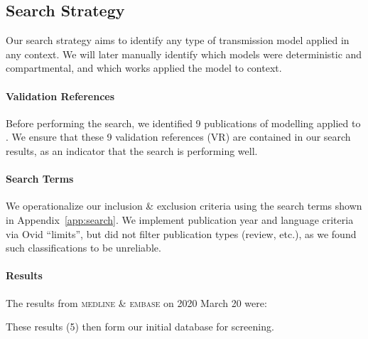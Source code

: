 \documentclass{article}
\begin{document}
\subsection{Search Strategy}
Our search strategy aims to identify
any type of \hiv transmission model applied in any context.
We will later manually identify
which models were deterministic and compartmental,
and which works applied the model to \ssa context.
\paragraph{Validation References}\n
Before performing the search, we identified
9 publications of \hiv modelling applied to \ssa.
We ensure that these 9 validation references (VR)
are contained in our search results,
as an indicator that the search is performing well.
\par
{}
\paragraph{Search Terms}\n
We operationalize our inclusion \& exclusion criteria
using the search terms shown in Appendix~\ref{app:search}.
We implement publication year and language criteria via Ovid ``limits'',
but did not filter publication types (review, etc.),
as we found such classifications to be unreliable.
\paragraph{Results}\n
The results from \textsc{medline} \& \textsc{embase} on 2020 March 20 were:
\begin{table}[h]
  \centerline{}
\end{table}
\par
These results (5) then form our initial database for screening.
\end{document}
